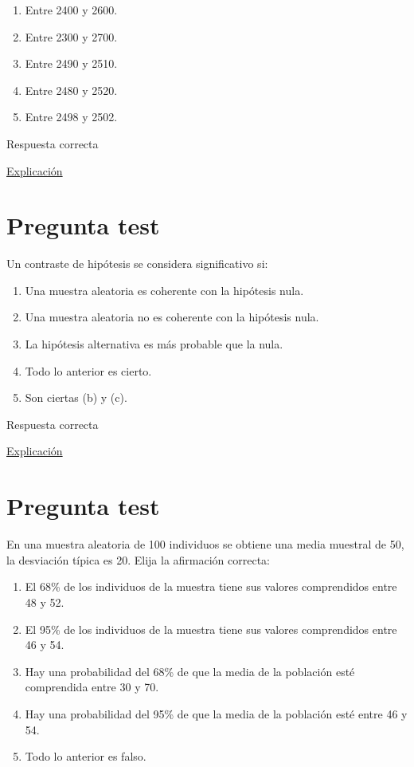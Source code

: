\documentclass[
]{book}
\providecommand{\tightlist}{%
  \setlength{\itemsep}{0pt}\setlength{\parskip}{0pt}}
\begin{document}
\begin{enumerate}
\def\labelenumi{\alph{enumi})}
\tightlist
\item
  Entre 2400 y 2600.
\item
  Entre 2300 y 2700.
\item
  Entre 2490 y 2510.
\item
  Entre 2480 y 2520.
\item
  Entre 2498 y 2502.
\end{enumerate}

Respuesta correcta

\href{https://homepage.divms.uiowa.edu/~mbognar/}{Explicación}

\hypertarget{pregunta-test-101}{%
\section{Pregunta test}\label{pregunta-test-101}}

Un contraste de hipótesis se considera significativo si:

\begin{enumerate}
\def\labelenumi{\alph{enumi})}
\tightlist
\item
  Una muestra aleatoria es coherente con la hipótesis nula.
\item
  Una muestra aleatoria no es coherente con la hipótesis nula.
\item
  La hipótesis alternativa es más probable que la nula.
\item
  Todo lo anterior es cierto.
\item
  Son ciertas (b) y (c).
\end{enumerate}

Respuesta correcta

\href{https://1fjmanzano.github.io/bioestadistica/contrastes-de-hipo\%CC\%81tesis.html}{Explicación}

\hypertarget{pregunta-test-102}{%
\section{Pregunta test}\label{pregunta-test-102}}

En una muestra aleatoria de 100 individuos se obtiene una media muestral de 50, la desviación típica es 20. Elija la afirmación correcta:

\begin{enumerate}
\def\labelenumi{\alph{enumi})}
\tightlist
\item
  El 68\% de los individuos de la muestra tiene sus valores comprendidos entre 48 y 52.
\item
  El 95\% de los individuos de la muestra tiene sus valores comprendidos entre 46 y 54.
\item
  Hay una probabilidad del 68\% de que la media de la población esté comprendida entre 30 y 70.
\item
  Hay una probabilidad del 95\% de que la media de la población esté entre 46 y 54.
\item
  Todo lo anterior es falso.
\end{enumerate}
\end{document}
